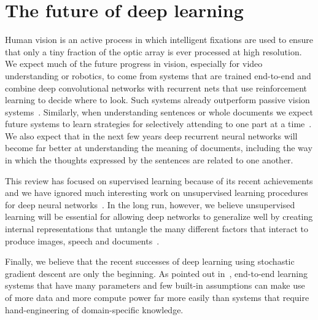 \documentclass[10pts]{article}
\begin{document}
\section{The future of deep learning}

Human vision is an active process in which intelligent fixations are used
to ensure that only a tiny fraction of the optic array is ever processed at
high resolution. We expect much of the future progress in vision,
especially for video understanding or robotics, to come from systems that
are trained end-to-end and combine deep convolutional networks with
recurrent nets that use reinforcement learning to decide where to
look.  Such systems already outperform passive vision
systems~\citep{ba+mnih}.  Similarly, when understanding sentences or whole
documents we expect future systems to learn strategies for selectively
attending to one part at a time~\citep{Bahdanau-et-al-arxiv2014}. We also expect
that in the next few years deep recurrent neural networks will become far
better at understanding the meaning of documents, including the way in
which the thoughts expressed by the sentences are related to one another.

This review has focused on supervised learning because of its recent
achievements and we have ignored much interesting work on unsupervised
learning procedures for deep neural 
networks~\citep{Salakhutdinov2009-small,Hinton95,QuocLe-ICML2012,VincentPLarochelleH2008-small,ranzato-pami,Bengio-et-al-ICML-2014,Kingma-et-al-NIPS2014}. 
In the long run,
however, we believe unsupervised learning will be essential for allowing
deep networks to generalize well by creating internal representations that
untangle the many different factors that interact to produce images, speech
and documents~\citep{Bengio-Courville-Vincent-TPAMI2013}.

Finally, we believe that the recent successes of deep learning using
stochastic gradient descent are only the beginning.  As pointed out
in~\citet{Bengio+Lecun-chapter2007-small}, end-to-end learning
systems that have many parameters and few built-in assumptions can make use
of more data and more compute power far more easily than systems that
require hand-engineering of domain-specific knowledge.

 
\end{document}
